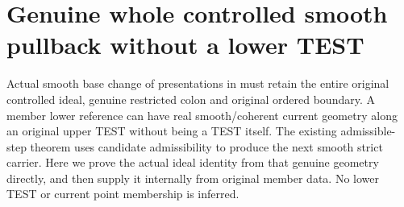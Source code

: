 \section{Genuine whole controlled smooth pullback without a lower TEST}

Actual smooth base change of presentations in
\cite[Section~7]{bierstone-milman08-functoriality} must retain the entire
original controlled ideal, genuine restricted colon and original ordered
boundary. A member lower reference can have real smooth/coherent current
geometry along an original upper TEST without being a TEST itself. The
existing admissible-step theorem uses candidate admissibility to produce
the next smooth strict carrier. Here we prove the actual ideal identity
from that genuine geometry directly, and then supply it internally from
original member data. No lower TEST or current point membership is inferred.

